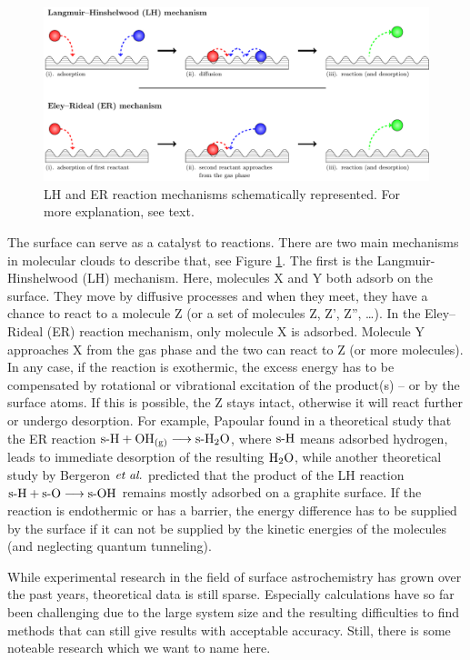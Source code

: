 \begin{figure}[b!]
\includegraphics[width=\textwidth]{TikzPics/TikzCreation/LHAndER/LHAndER.pdf}
\caption{LH and ER reaction mechanisms schematically represented. For
more explanation, see text.}
\label{Int:LHandER}
\end{figure}

The surface can serve as a catalyst to reactions. There are two main mechanisms
in molecular clouds to describe that, see Figure \ref{Int:LHandER}. The first
is the Langmuir-Hinshelwood (LH) mechanism.\cite{LangmuirHinshelwood} Here, molecules X and Y both adsorb on the surface. They move by diffusive processes and when they meet, they have a
chance to react to a molecule Z (or a set of molecules Z, Z', Z'', \ldots).
In the Eley--Rideal (ER) reaction mechanism, only molecule X
is adsorbed.\cite{Laidler1996}
Molecule Y approaches X from the gas phase and the two can react to Z (or more
molecules). In any case, if the reaction is exothermic, the excess energy has
to be compensated by rotational or vibrational excitation of the product(s) --
or by the surface atoms.
If this is possible, the Z stays intact, otherwise it will react further or
undergo desorption. For example, Papoular found in a
theoretical study that the ER reaction $\text{s-}{\text H}+{\text O \text H}_\text{(g)}\longrightarrow\text{s-}{\ensuremath{\text H _2 \text O}}$,
where $\text{s-}{\text H}$ means adsorbed hydrogen, leads to immediate desorption of
the resulting $\text H _2 \text O$,\cite{Papoular2005} while another theoretical study by Bergeron $\emph{et al.}$ predicted that the product of the LH reaction 
$\text{s-}{\text H}+\text{s-}{\text O}\longrightarrow\text{s-}{\ensuremath{\text O \text H}}$ remains mostly adsorbed on a graphite
surface.\cite{BergeronRougeauSidisEtAl2008}
If the reaction is endothermic or has a barrier, the energy difference has to
be supplied by the surface if it can not be supplied by the kinetic energies of
the molecules (and neglecting quantum tunneling).

While experimental research in the field of surface astrochemistry has grown
over the past years, theoretical data is still sparse. Especially 
calculations have so far been challenging due to the large system size and the
resulting difficulties to find methods that can still give results with
acceptable accuracy. Still, there is some noteable research which we want to
name here.

